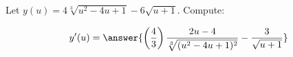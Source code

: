 \documentclass{ximera}
\author{Bobby Ramsey}
\begin{document}
\begin{exercise}
	Let $y(u) = 4\sqrt[3]{u^2-4u+1} - 6 \sqrt{u+1}$. 
	Compute:

	\[ y'(u) =\answer{ \left(\frac{4}{3}\right) \frac{2u-4}{\sqrt[3]{(u^2-4u+1)^2}} - \frac{3}{\sqrt{u+1}} } \]
\end{exercise}
\end{document}
